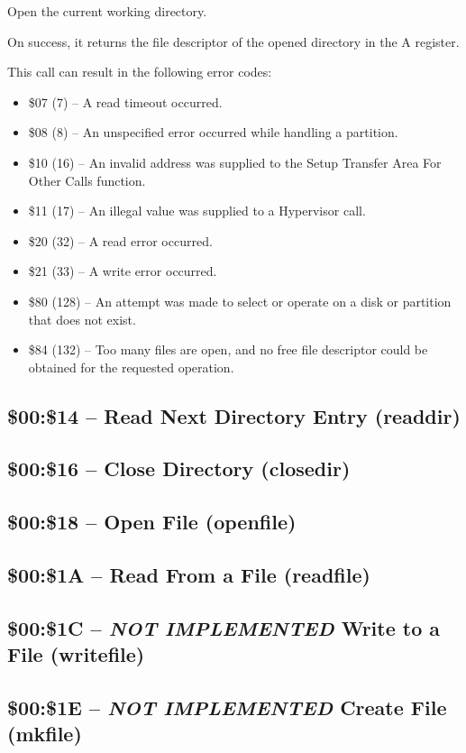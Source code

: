 Open the current working directory.

On success, it returns the file descriptor of the opened directory in the A register.

This call can result in the following error codes:

\begin{itemize}
\item \$07 (7) -- A read timeout occurred.
  \item \$08 (8) -- An unspecified error occurred while handling a partition.
\item \$10 (16) -- An invalid address was supplied to the Setup Transfer Area For Other Calls function.
\item \$11 (17) -- An illegal value was supplied to a Hypervisor call.
\item \$20 (32) -- A read error occurred.
\item \$21 (33) -- A write error occurred.
\item \$80 (128) -- An attempt was made to select or operate on a disk or partition that does not exist.
\item \$84 (132) -- Too many files are open, and no free file descriptor could be obtained for the requested operation.
\end{itemize}

\subsection{\$00:\$14 -- Read Next Directory Entry (readdir)}
\subsection{\$00:\$16 -- Close Directory (closedir)}
\subsection{\$00:\$18 -- Open File (openfile)}
\subsection{\$00:\$1A -- Read From a File (readfile)}
\subsection{\$00:\$1C -- {\em NOT IMPLEMENTED} Write to a File (writefile)}
\subsection{\$00:\$1E -- {\em NOT IMPLEMENTED} Create File (mkfile)}

